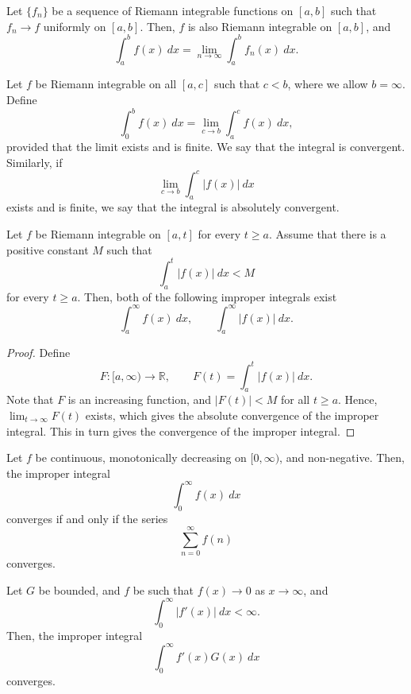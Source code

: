 \documentclass[11pt]{article}
\def\R{\mathbb{R}}
\def\N{\mathbb{N}}
\theoremstyle{definition}
\theoremstyle{remark}
\numberwithin{equation}{module}
\begin{document}
    \begin{theorem}
        Let $\{f_n\}$ be a sequence of Riemann integrable
        functions on $[a, b]$ such that $f_n \to f$ uniformly on $[a, b]$. Then, $f$
        is also Riemann integrable on $[a, b]$, and \[
            \int_a^b f(x)\:dx = \lim_{n \to \infty} \int_a^b f_n(x)\:dx.
        \] 
    \end{theorem}

    \begin{definition}
        Let $f$ be Riemann integrable on all $[a, c]$ such that $c < b$, where we
        allow $b = \infty$. Define \[
            \int_0^b f(x)\:dx = \lim_{c \to b} \int_a^c f(x)\:dx,
        \] provided that the limit exists and is finite.
        We say that the integral is convergent. Similarly, if \[
            \lim_{c \to b}\int_a^c |f(x)|\:dx
        \] exists and is finite, we say that the integral is absolutely convergent.
    \end{definition}

    \begin{theorem}
        Let $f$ be Riemann integrable on $[a, t]$ for every $t \geq a$. Assume that
        there is a positive constant $M$ such that \[
            \int_a^t |f(x)|\:dx < M
        \] for every $t \geq a$. Then, both of the following improper integrals exist \[
            \int_a^\infty f(x)\:dx, \qquad \int_a^\infty |f(x)|\:dx.
        \]
    \end{theorem}
    \begin{proof}
        Define \[
            F\colon[a, \infty) \to \R, \qquad F(t) = \int_a^t |f(x)|\:dx.
        \] Note that $F$ is an increasing function, and $|F(t)| < M$ for all $t \geq
        a$. Hence, $\lim_{t \to \infty} F(t)$ exists, which gives the absolute
        convergence of the improper integral. This in turn gives the convergence of
        the improper integral.
    \end{proof}

    \begin{theorem}
        Let $f$ be continuous, monotonically decreasing on $[0, \infty)$, and
        non-negative. Then, the improper integral \[
            \int_0^\infty f(x)\:dx
        \] converges if and only if the series \[
            \sum_{n = 0}^\infty f(n)
        \] converges.
    \end{theorem}

    
    \begin{theorem}
        Let $G$ be bounded, and $f$ be such that $f(x) \to 0$ as $x \to \infty$, and
        \[
            \int_0^\infty |f'(x)|\:dx < \infty.
        \] Then, the improper integral \[
            \int_0^\infty f'(x)G(x)\:dx
        \] converges.
    \end{theorem}
\end{document}
